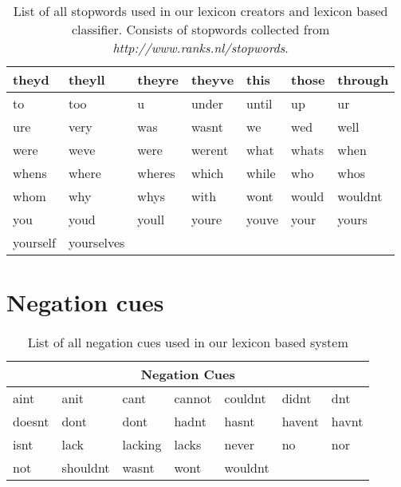 \begin{table}[H]
\begin{tabular}{| l | l | l | l | l | l | l |}
        theyd & theyll & theyre & theyve & this & those & through\\ \hline
        to & too & u & under & until & up & ur\\ \hline
        ure & very & was & wasnt & we & wed & well\\ \hline
        were & weve & were & werent & what & whats & when\\ \hline
        whens & where & wheres & which & while & who & whos\\ \hline
        whom & why & whys & with & wont & would & wouldnt\\ \hline
        you & youd & youll & youre & youve & your & yours\\ \hline
        yourself & yourselves & \multicolumn{5}{c|}{} \\ \hline
    \end{tabular}
    \caption[List of all stopwords used in our lexicon based system]{List of all stopwords used in our lexicon creators and lexicon based classifier. Consists of stopwords collected from \textit{http://www.ranks.nl/stopwords}.}
    \label{tab:master_stopwords}
\end{table}


\section{Negation cues}
\begin{table}[H]
    \begin{tabular}{| l | l | l | l | l | l | l |}
        \hline
        \multicolumn{7}{|c|}{\textbf{Negation Cues}} \\ \hline
        aint & anit & cant & cannot & couldnt & didnt & dnt \\ \hline
        doesnt & dont & dont & hadnt & hasnt & havent & havnt \\ \hline
        isnt & lack & lacking & lacks & never & no & nor \\ \hline
        not & shouldnt & wasnt & wont & wouldnt & \multicolumn{2}{c|}{} \\ \hline
    \end{tabular}
    \caption{List of all negation cues used in our lexicon based system}
    \label{tab:master_negation_cues}
\end{table}


